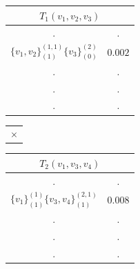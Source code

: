 \documentclass[12pt]{article}
\begin{document}
\begin{table}[!htb]
    \begin{minipage}{.3\linewidth}
      \centering
     \begin{tabular}{cc}
\multicolumn{2}{c}{$T_1(v_1,v_2,v_3)$}                           \\ \hline
\multicolumn{1}{|c}{.} & \multicolumn{1}{|c|}{.} \\ \hline
\multicolumn{1}{|l}{$\{v_1,v_2\}^{(1,1)}_{(1)} \{v_3\}^{(2)}_{(0)}$} & \multicolumn{1}{|l|}{$0.002$} \\ \hline
                             \multicolumn{1}{|c}{.} & \multicolumn{1}{|c|}{.} \\ \hline               
                   \multicolumn{1}{|c}{.} & \multicolumn{1}{|c|}{.} \\ \hline
                   \multicolumn{1}{|c}{.} & \multicolumn{1}{|c|}{.} \\ \hline        
\end{tabular}
    \end{minipage}%
    \begin{minipage}{.05\linewidth}
        \begin{tabular}{c}
     $ \times$\\
        \end{tabular}
    \end{minipage}%
     \begin{minipage}{.3\linewidth}
      \centering
     \begin{tabular}{cc}
\multicolumn{2}{c}{$T_2(v_1,v_3,v_4)$}                           \\ \hline
\multicolumn{1}{|c}{.} & \multicolumn{1}{|c|}{.} \\ \hline
\multicolumn{1}{|l}{$\{v_1\}^{(1)}_{(1)}\{v_3,v_4\}^{(2,1)}_{(1)}$} & \multicolumn{1}{|l|}{$0.008$} \\ \hline
                   \multicolumn{1}{|c}{.} & \multicolumn{1}{|c|}{.} \\ \hline               
                   \multicolumn{1}{|c}{.} & \multicolumn{1}{|c|}{.} \\ \hline
                   \multicolumn{1}{|c}{.} & \multicolumn{1}{|c|}{.} \\ \hline        
\end{tabular}
    \end{minipage}%
      \begin{minipage}{.06\linewidth}
        \begin{tabular}{c}

\end{tabular}
\end{minipage}
\end{table}
\end{document}
